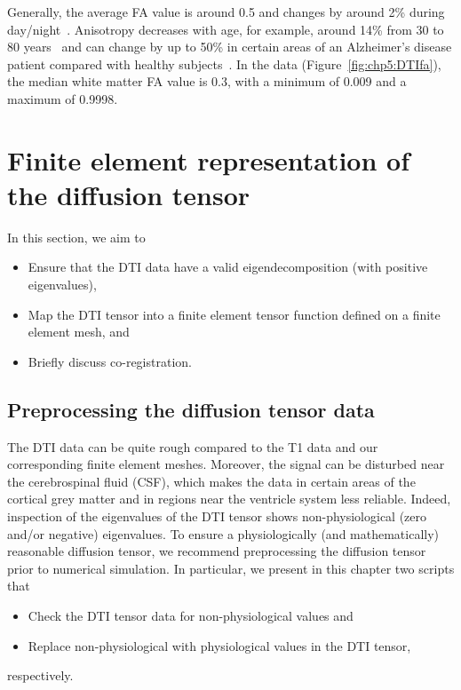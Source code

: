 Generally, the average FA value is around 0.5 and changes by around 2\%
during day/night~\cite{voldsbekk2020evidence}.  Anisotropy decreases
with age, for example, around 14\% from 30 to 80
years~\cite{kochunov2011fractional} and can change by up to
50\% in certain areas of an Alzheimer's disease patient compared with
healthy subjects~\cite{naggara2006diffusion}. In the  data 
(Figure~\ref{fig:chp5:DTIfa}), the median white matter FA value is
0.3, with a minimum of 0.009 and a maximum of 0.9998.

\section{Finite element representation of the diffusion tensor}

In this section, we aim to
\begin{itemize}
\item
  Ensure that the DTI data have a valid eigendecomposition (with positive eigenvalues),
\item
  Map the DTI tensor into a finite element tensor function defined on
  a finite element mesh, and
\item
  Briefly discuss co-registration.
\end{itemize}

\subsection{Preprocessing the diffusion tensor data}

The DTI data can be quite rough compared to the T1 data and our
corresponding finite element meshes. Moreover, the signal can be
disturbed near the cerebrospinal fluid (CSF), which makes the data in certain areas of
the cortical grey matter and in regions near the ventricle system
less reliable. Indeed, inspection of the eigenvalues of the DTI tensor
shows non-physiological (zero and/or negative) eigenvalues. To ensure
a physiologically (and mathematically) reasonable diffusion tensor, we
recommend preprocessing the diffusion tensor prior to numerical
simulation. In particular, we present in this chapter two scripts that
\begin{itemize}
\item
  Check the DTI tensor data for non-physiological values and
\item
  Replace non-physiological with physiological values in the DTI tensor,
\end{itemize}
respectively.


